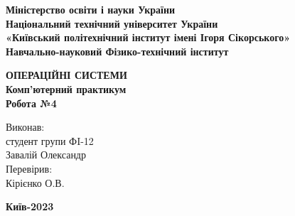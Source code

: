 \documentclass[a4paper,12pt]{article}
\begin{document}
    \pagestyle{fancy}
    \fancyhead{}
    \begin{center}
        \large{\textbf{Міністерство освіти і науки України\\
                Національний технічний університет України\\
                «Київський політехнічний інститут імені Ігоря Сікорського»\\
                Навчально-науковий Фізико-технічний інститут}}\\
        \hfill \break \hfill \break \hfill\break \hfill \break \hfill \break \hfill \break \hfill \break
        \hfill \break \hfill \break \hfill \break
        \begin{center}
            \normalsize{\textbf{ОПЕРАЦІЙНІ СИСТЕМИ\\
            Комп’ютерний практикум\\
            Робота №4}}
        \end{center}
    \end{center}
    \hfill \break \hfill \break \hfill \break \hfill \break \hfill \break \hfill \break \hfill \break
    \hfill \break \hfill \break \hfill \break \hfill \break 
    \begin{flushright}
        \large{ \hspace{35pt} Виконав:\\
            студент групи ФI-12\\
            Завалій Олександр\\} 
        \large{ \hspace{35pt} Перевірив:\\
        Кірієнко О.В.} 
    \end{flushright}
    \hfill \break \hfill \break \hfill \break \hfill \break \hfill \break \hfill \break \hfill \break
    \hfill \break
    \begin{center} \textbf{Київ-2023} \end{center}
    \thispagestyle{empty}
\end{document}
